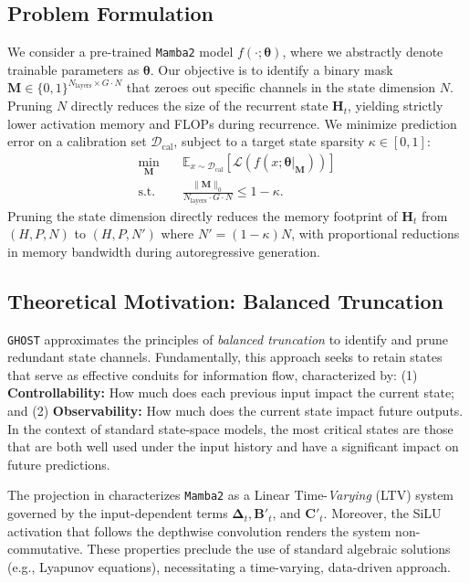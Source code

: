 \documentclass{article}
\theoremstyle{plain}
\theoremstyle{definition}
\theoremstyle{remark}
\begin{document}
\subsection{Problem Formulation}
\label{subsec:problem_formulation}
We consider a pre-trained \texttt{Mamba2} model $f(\cdot; \bm{\theta})$, where we abstractly denote trainable parameters as $\bm{\theta}$. Our objective is to identify a binary mask $\bm{M} \in \{0, 1\}^{N_{\text{layers}} \times G \cdot N}$ that zeroes out specific channels in the state dimension $N$. Pruning $N$ directly reduces the size of the recurrent state $\bm{H}_t$, yielding strictly lower activation memory and FLOPs during recurrence. We minimize prediction error on a calibration set $\mathcal{D}_{\text{cal}}$, subject to a target state sparsity $\kappa \in [0,1]$:
\begin{equation*}
\begin{aligned}
\min_{\bm{M}} \quad & \mathbb{E}_{x \sim \mathcal{D}_{\text{cal}}} [\mathcal{L}(f(x; \bm{\theta}|_{\bm{M}}))]\\
\textrm{s.t.} \quad & \frac{\|\bm{M}\|_0}{N_{\text{layers}} \cdot G \cdot N} \leq 1 - \kappa.
\end{aligned}
\end{equation*}
Pruning the state dimension directly reduces the memory footprint of $\bm{H}_t$ from $(H, P, N)$ to $(H, P, N')$ where $N' = (1-\kappa)N$, with proportional reductions in memory bandwidth during autoregressive generation.


\subsection{Theoretical Motivation: Balanced Truncation}
\label{subsec:balanced_truncation}
\texttt{GHOST} approximates the principles of \textit{balanced truncation} \citep{moore_principal_1981} to identify and prune redundant state channels. Fundamentally, this approach seeks to retain states that serve as effective conduits for information flow, characterized by: (1) \textbf{Controllability:} How much does each previous input impact the current state; and (2) \textbf{Observability:} How much does the current state impact future outputs. In the context of standard state-space models, the most critical states are those that are both well used under the input history and have a significant impact on future predictions.

The projection in  characterizes \texttt{Mamba2} as a Linear Time-\textit{Varying} (LTV) system governed by the input-dependent terms $\bm{\Delta}_t, \bm{B}'_t$, and $\bm{C}'_t$. Moreover, the SiLU activation that follows the depthwise convolution renders the system non-commutative. These properties preclude the use of standard algebraic solutions (e.g., Lyapunov equations), necessitating a time-varying, data-driven approach.
\end{document}
